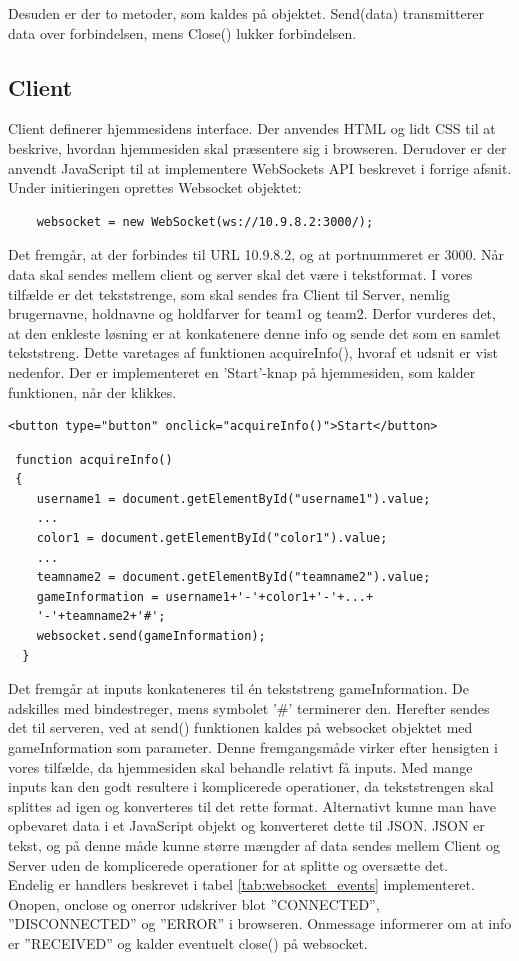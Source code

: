 \documentclass[Softwaredesign/Softwaredesign_main.tex]{subfiles}
\begin{document}
Desuden er der to metoder, som kaldes på objektet. Send(data) transmitterer data over forbindelsen, mens Close() lukker forbindelsen.

\subsection{Client}\label{client_doc}
Client definerer hjemmesidens interface. Der anvendes HTML og lidt CSS til at beskrive, hvordan hjemmesiden skal præsentere sig i browseren. Derudover er der anvendt JavaScript til at implementere WebSockets API beskrevet i forrige afsnit. Under initieringen oprettes Websocket objektet:
\begin{lstlisting}
    websocket = new WebSocket(ws://10.9.8.2:3000/);
\end{lstlisting}
Det fremgår, at der forbindes til URL 10.9.8.2, og at portnummeret er 3000. Når data skal sendes mellem client og server skal det være i tekstformat. I vores tilfælde er det tekststrenge, som skal sendes fra Client til Server, nemlig brugernavne, holdnavne og holdfarver for team1 og team2. Derfor vurderes det, at den enkleste løsning er at konkatenere denne info og sende det som en samlet tekststreng. Dette varetages af funktionen acquireInfo(), hvoraf et udsnit er vist nedenfor. Der er implementeret en 'Start'-knap på hjemmesiden, som kalder funktionen, når der klikkes.\\
\begin{lstlisting}
<button type="button" onclick="acquireInfo()">Start</button>
\end{lstlisting}
\begin{lstlisting}
 function acquireInfo()
 {
    username1 = document.getElementById("username1").value;
    ...
    color1 = document.getElementById("color1").value;
    ...
    teamname2 = document.getElementById("teamname2").value;
    gameInformation = username1+'-'+color1+'-'+...+
    '-'+teamname2+'#';
    websocket.send(gameInformation);
  }
\end{lstlisting}
Det fremgår at inputs konkateneres til én tekststreng gameInformation. De adskilles med bindestreger, mens symbolet '\#' terminerer den. Herefter sendes det til serveren, ved at send() funktionen kaldes på websocket objektet med gameInformation som parameter. Denne fremgangsmåde virker efter hensigten i vores tilfælde, da hjemmesiden skal behandle relativt få inputs. Med mange inputs kan den godt resultere i komplicerede operationer, da tekststrengen skal splittes ad igen og konverteres til det rette format. Alternativt kunne man have opbevaret data i et JavaScript objekt og konverteret dette til JSON.\cite{json_intro} JSON er tekst, og på denne måde kunne større mængder af data sendes mellem Client og Server uden de komplicerede operationer for at splitte og oversætte det.
\\Endelig er handlers beskrevet i tabel \ref{tab:websocket_events} implementeret. Onopen, onclose og onerror udskriver blot ''CONNECTED'', ''DISCONNECTED'' og ''ERROR'' i browseren. Onmessage informerer om at info er ''RECEIVED'' og kalder eventuelt close() på websocket.
\end{document}
